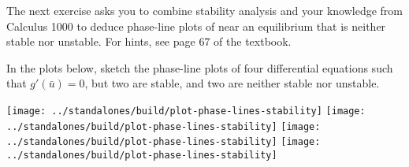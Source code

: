 \documentclass[../main.tex]{subfiles}
\begin{document}
\bigskip
The next exercise asks you to combine stability analysis and your knowledge from Calculus 1000 to deduce phase-line plots of near an equilibrium that is neither stable nor unstable. For hints, see page 67 of the textbook.

\begin{example}
  In the plots below, sketch the phase-line plots of four differential equations such that \(g'(\bar{u}) = 0\), but two are stable, and two are neither stable nor unstable.

  \begin{center}
    \texttt{[image: ../standalones/build/plot-phase-lines-stability]}
    \quad
    \texttt{[image: ../standalones/build/plot-phase-lines-stability]}
    \quad
    \texttt{[image: ../standalones/build/plot-phase-lines-stability]}
    \quad
    \texttt{[image: ../standalones/build/plot-phase-lines-stability]}
  \end{center}
\end{example}
\end{document}
